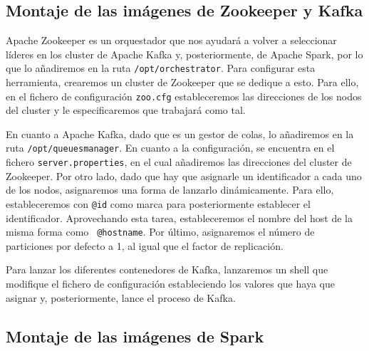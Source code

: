 \subsection{Montaje de las imágenes de Zookeeper y Kafka\label{montKafka}}

Apache Zookeeper es un orquestador que nos ayudará a volver a seleccionar
líderes en los cluster de Apache Kafka y, posteriormente, de Apache Spark,
por lo que lo añadiremos en la ruta {\tt /opt/orchestrator}. Para
configurar esta herramienta, crearemos un cluster de Zookeeper que se
dedique a esto. Para ello, en el fichero de configuración {\tt zoo.cfg}
estableceremos las direcciones de los nodos del cluster y le
especificaremos que trabajará como tal.

En cuanto a Apache Kafka, dado que es un gestor de colas, lo añadiremos en
la ruta {\tt /opt/queuesmanager}. En cuanto a la configuración, se
encuentra en el fichero {\tt server.properties}, en el cual añadiremos las
direcciones del cluster de Zookeeper. Por otro lado, dado que hay que
asignarle un identificador a cada uno de los nodos, asignaremos una forma
de lanzarlo dinámicamente. Para ello, estableceremos con {\tt @id} como
marca para posteriormente establecer el identificador. Aprovechando esta
tarea, estableceremos el nombre del host de la misma forma como {\tt
  @hostname}. Por último, asignaremos el número de particiones por defecto
a 1, al igual que el factor de replicación.

Para lanzar los diferentes contenedores de Kafka, lanzaremos un shell que
modifique el fichero de configuración estableciendo los valores que haya
que asignar y, posteriormente, lance el proceso de Kafka.


\subsection{Montaje de las imágenes de Spark\label{montSpark}}

